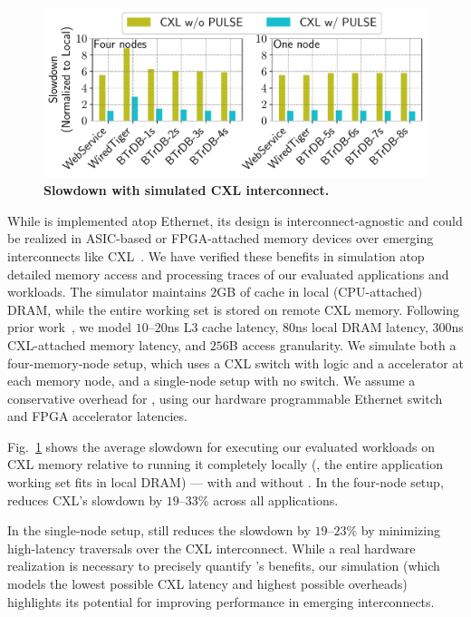 \begin{figure}[t]
\centering
\includegraphics[width=0.9\columnwidth]{fig/pulse/cxl.pdf}
\caption[Slowdown with simulated CXL interconnect]{\textbf{Slowdown with simulated CXL interconnect.} }

\label{fig:eval_cxl}
\end{figure}

While \pulse is implemented atop Ethernet, its design is interconnect-agnostic and could be realized in ASIC-based or FPGA-attached memory devices over emerging interconnects like CXL~\cite{cxl, cxl_azure, sun2023demystifying}. We have verified these benefits in simulation atop detailed memory access and processing traces of our evaluated applications and workloads. The simulator maintains $2$GB of cache in local (CPU-attached) DRAM, while the entire working set is stored on remote CXL memory. Following prior work~\cite{pond}, we model $10$--$20$ns L3 cache latency, $80$ns local DRAM latency, $300$ns CXL-attached memory latency, and $256$B access granularity. We simulate both a four-memory-node setup, which uses a CXL switch with \pulse logic and a \pulse accelerator at each memory node, and a single-node setup with no switch. We assume a conservative overhead for \pulse, using our hardware programmable Ethernet switch and FPGA accelerator latencies.
 
 
Fig.~\ref{fig:eval_cxl} shows the average slowdown for executing our evaluated workloads on CXL memory relative to running it completely locally (\ie, the entire application working set fits in local DRAM) --- with and without \pulse. In the four-node setup, \pulse reduces CXL's slowdown by $19$--$33$\% across all applications. 

In the single-node setup, \pulse still reduces the slowdown by $19$--$23$\% by minimizing high-latency traversals over the CXL interconnect. While a real hardware realization is necessary to precisely quantify \pulse's benefits, our simulation (which models the lowest possible CXL latency and highest possible \pulse overheads) highlights its potential for improving performance in emerging interconnects.

